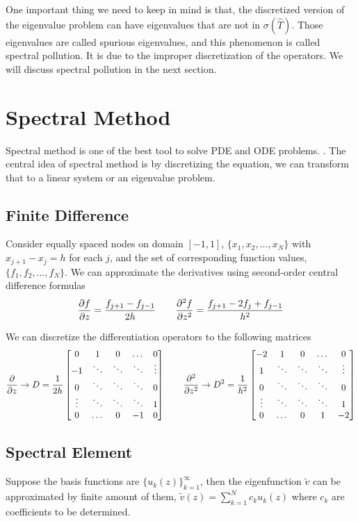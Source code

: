 One important thing we need to keep in mind is that, the discretized version of the eigenvalue problem can have eigenvalues that are not in $\sigma(\hat{T})$. Those eigenvalues are called spurious eigenvalues, and this phenomenon is called spectral pollution. It is due to the improper discretization of the operators. We will discuss spectral pollution in the next section.

\section{Spectral Method}
Spectral method is one of the best tool to solve PDE and ODE problems. \cite{trefethen_spectral_nodate}. The central idea of spectral method is by discretizing the equation, we can transform that to a linear system or an eigenvalue problem.
\subsection{Finite Difference}
Consider equally spaced nodes on domain $[-1,1]$, $\{x_1, x_2, \dots, x_N\}$ with $x_{j+1}-x_{j} = h$ for each $j$, and the set of corresponding function values, $\{ f_1, f_2, \dots, f_N \}$. We can approximate the derivatives using second-order central difference formulas
\[ 
\pdv{f}{z} = \frac{f_{j+1} - f_{j-1}}{2h}
\qquad
\pdv[2]{f}{z} = \frac{f_{j+1} -2f_{j} +f_{j-1}}{h^2}
\]

We can discretize the differentiation operators to the following matrices
\[ 
\pdv{z} \rightarrow D = \frac{1}{2h}\begin{bmatrix}
	0 & 1 & 0 & \dots & 0 \\
	-1 & \ddots & \ddots & \ddots & \vdots \\ 
	0 & \ddots & \ddots & \ddots & 0 \\
	\vdots & \ddots & \ddots & \ddots & 1 \\
	0 & \dots & 0 & -1 & 0 
\end{bmatrix} 
\qquad
\pdv[2]{z} \rightarrow  D^2 = \frac{1}{h^2}\begin{bmatrix}
	-2 & 1 & 0 & \dots & 0 \\
	1 & \ddots & \ddots & \ddots & \vdots \\ 
	0 & \ddots & \ddots & \ddots & 0 \\
	\vdots & \ddots & \ddots & \ddots & 1 \\
	0 & \dots & 0 & 1 & -2 
\end{bmatrix} 
\]

\subsection{Spectral Element}
Suppose the basis functions are $\{u_k(z)\}_{k=1}^\infty$, then the eigenfunction $\tilde{v}$ can be approximated by finite amount of them, $\tilde{v}(z) = \sum_{k=1}^N c_ku_k(z)$ where $c_k$ are coefficients to be determined.

